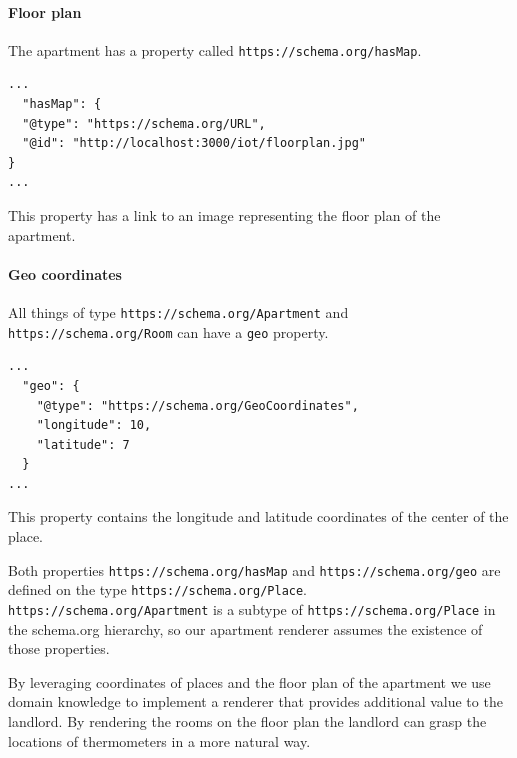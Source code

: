 \paragraph{Floor plan}
The apartment has a property called \lstinline{https://schema.org/hasMap}.

\lstset{language=JSON}
\begin{lstlisting}[caption=The \lstinline{hasMap} property of apartment /apartments/0.]
...
  "hasMap": {
  "@type": "https://schema.org/URL",
  "@id": "http://localhost:3000/iot/floorplan.jpg"
}
...
\end{lstlisting}

This property has a link to an image representing the floor plan of the apartment.

\paragraph{Geo coordinates}
All things of type \lstinline{https://schema.org/Apartment} and \lstinline{https://schema.org/Room} can have a \lstinline{geo} property.

\lstset{language=JSON}
\begin{lstlisting}[caption=The \lstinline{https://schema.org/geo} property of apartment /apartments/0.]
...
  "geo": {
    "@type": "https://schema.org/GeoCoordinates",
    "longitude": 10,
    "latitude": 7
  }
...
\end{lstlisting}

This property contains the longitude and latitude coordinates of the center of the place.

Both properties \lstinline{https://schema.org/hasMap} and \lstinline{https://schema.org/geo} are defined on the type \lstinline{https://schema.org/Place}. \lstinline{https://schema.org/Apartment} is a subtype of \lstinline{https://schema.org/Place} in the schema.org hierarchy, so our apartment renderer assumes the existence of those properties.

By leveraging coordinates of places and the floor plan of the apartment we use domain knowledge to implement a renderer that provides additional value to the landlord. By rendering the rooms on the floor plan the landlord can grasp the locations of thermometers in a more natural way.


